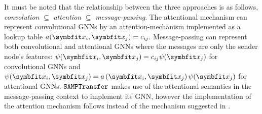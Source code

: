It must be noted that the relationship between the three approaches is as follows, \textit{convolution} $\subseteq$ \textit{attention} $\subseteq$ \textit{message-passing}. The attentional mechanism can represent convolutional GNNs by an attention-mechanism implemented as a lookup table $a(\bfitx_i, \bfitx_j) = c_{ij}$. Message-passing can represent both convolutional and attentional GNNs where the messages are only the sender node's features: $\psi(\bfitx_i, \bfitx_j)=c_{ij}\psi(\bfitx_j)$ for convolutional GNNs and $\psi(\bfitx_i, \bfitx_j)=a\left(\bfitx_{i}, \bfitx_{j}\right)\psi(\bfitx_j)$ for attentional GNNs. $\texttt{SAMPTransfer}$ makes use of the attentional semantics in the message-passing context to implement its GNN, however the implementation of the attention mechanism follows \parencite{vaswani2017attention} instead of the mechanism suggested in \parencite{velic018graph}.